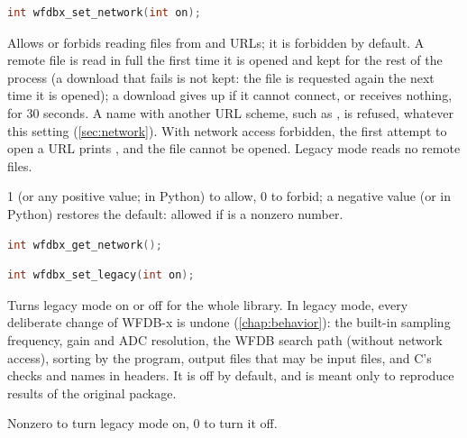 \begin{lstlisting}[language=C++,style=signature]
int wfdbx_set_network(int on);
\end{lstlisting}
Allows or forbids reading files from  and 
URLs; it is forbidden by default. A remote file is read in full the first
time it is opened and kept for the rest of the process (a download that
fails is not kept: the file is requested again the next time it is opened);
a download gives up if it cannot connect, or receives nothing, for 30
seconds. A name with another URL scheme, such as , is refused,
whatever this setting (\cref{sec:network}). With network
access forbidden, the first attempt to open a URL prints , and the file cannot be opened. Legacy mode reads no remote
files.
\begin{params}
\item[on] 1 (or any positive value;  in Python) to allow, 0 to
  forbid; a negative value (or  in Python) restores the default:
  allowed if  is a nonzero number.
\end{params}

\begin{lstlisting}[language=C++,style=signature]
int wfdbx_get_network();
\end{lstlisting}

\begin{lstlisting}[language=C++,style=signature]
int wfdbx_set_legacy(int on);
\end{lstlisting}
Turns legacy mode on or off for the whole library. In legacy mode, every
deliberate change of WFDB-x is undone (\cref{chap:behavior}): the built-in
sampling frequency, gain and ADC resolution, the WFDB search path (without
network access), sorting by the  program, output files that may
be input files, and C's checks and names in headers. It is off by default,
and is meant only to reproduce results of the original package.
\begin{params}
\item[on] Nonzero to turn legacy mode on, 0 to turn it off.
\end{params}

